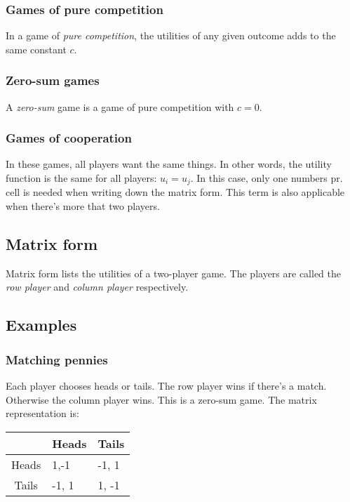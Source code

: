 \documentclass[12pt, a4paper]{article}
\begin{document}
\subsubsection{Games of pure competition}
In a game of \textit{pure competition}, the utilities of any given outcome adds to the same constant $c$.

\subsubsection{Zero-sum games}
A \textit{zero-sum} game is a game of pure competition with $c=0$.

\subsubsection{Games of cooperation}
In these games, all players want the same things. In other words, the utility function is the same for all players: $u_i=u_j$. In this case, only one numbers pr. cell is needed when writing down the matrix form. This term is also applicable when there's more that two players.

\subsection{Matrix form}
Matrix form lists the utilities of a two-player game. The players are called the \textit{row player} and \textit{column player} respectively.

\subsection{Examples}

\subsubsection{Matching pennies}
Each player chooses heads or tails. The row player wins if there's a match. Otherwise the column player wins. This is a zero-sum game. The matrix representation is:

\begin{table}[h]
\centering
\label{matrix:matching_pennies}
\begin{tabular}{c|l|l|}
\cline{2-3}
\multicolumn{1}{l|}{}   & \multicolumn{1}{c|}{Heads} & \multicolumn{1}{c|}{Tails} \\ \hline
\multicolumn{1}{|c|}{Heads} & 1,-1                   & -1, 1                  \\ \hline
\multicolumn{1}{|c|}{Tails} & -1, 1                  & 1, -1                 \\ \hline
\end{tabular}
\end{table}
\end{document}
